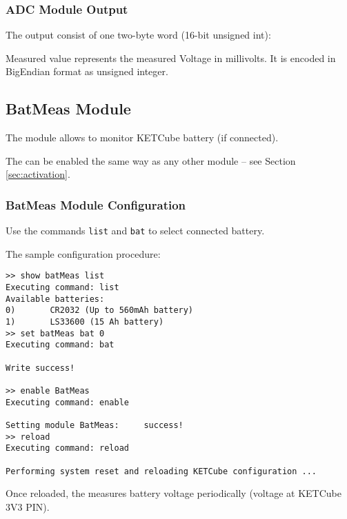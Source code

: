 \subsubsection{ADC Module Output}
  The  output consist of one two-byte word (16-bit unsigned int):
  

  Measured value represents the measured Voltage in millivolts. It is encoded in BigEndian format as unsigned integer.

\clearpage
\subsection{BatMeas Module}
  
The  module allows to monitor KETCube battery (if connected). 

The  can be enabled the same way as any other module -- see Section \ref{sec:activation}.

\subsubsection{BatMeas Module Configuration}
  Use the commands {\tt list} and {\tt bat} to select connected battery.
  
  The sample configuration procedure:
  
\begin{docCodeExample}
\begin{verbatim}
>> show batMeas list
Executing command: list
Available batteries:
0)       CR2032 (Up to 560mAh battery)
1)       LS33600 (15 Ah battery)
>> set batMeas bat 0
Executing command: bat

Write success!

>> enable BatMeas
Executing command: enable

Setting module BatMeas:     success!
>> reload
Executing command: reload

Performing system reset and reloading KETCube configuration ...
\end{verbatim}
\end{docCodeExample}

  Once reloaded, the  measures battery voltage periodically (voltage at KETCube 3V3 PIN). 
  
